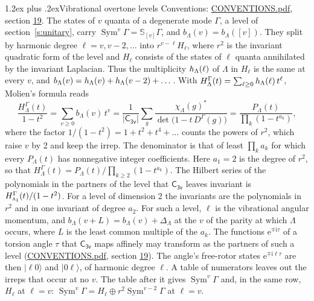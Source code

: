 \documentclass[10pt,a4paper]{article}
\makeatletter
\renewcommand\section{\@startsection{section}{1}{\z@}{-3ex plus -1ex minus -.2ex}%
  {1.2ex plus .2ex}{\normalfont\large\sffamily\bfseries\color{parttitle}}}
\numberwithin{equation}{section}
\newcommand{\grp}[1]{\mathsf{#1}}
\newcommand{\irr}[1]{\text{\normalfont\scshape #1}}
\newcommand{\iunit}{\mathrm{i}}
\newcommand{\expe}{\mathrm{e}}
\newcommand{\repD}[1]{D^{#1}}
\newcommand{\irchar}[1]{\chi_{#1}}
\newcommand{\conj}[1]{{#1}^{*}}
\newcommand{\schur}[1]{\mathbb{S}_{#1}}
\newcommand{\shape}[1]{[#1]}
\newcommand{\occ}[1]{\lvert #1\rangle}
\makeatother
\begin{document}
\section{Vibrational overtone levels}\label{s:overtones}
Conventions: \href{../../CONVENTIONS.pdf}{CONVENTIONS.pdf}, section \href{../../CONVENTIONS.pdf\#conv.19}{19}.
\leavevmode\label{n:index.quanta}\label{n:operator.symmetric.power}The states of $v$ quanta of a degenerate mode $\Gamma$, a level of section~\ref{s:unitary}, carry $\operatorname{Sym}^{v}\Gamma = \schur{\shape{v}}\Gamma$, and $b_\Lambda(v) = b_\Lambda(\shape{v})$. \label{n:local.quadratic.form}\label{n:set.harmonic}They split by harmonic degree $\ell = v, v - 2, \dots$ into $r^{v-\ell}H_\ell$, where $r^2$ is the invariant quadratic form of the level and $H_\ell$ consists of the states of $\ell$ quanta annihilated by the invariant Laplacian. \label{n:function.multiplicity.harmonic}Thus the multiplicity $\mathnormal{h}_\Lambda(\ell)$ of $\Lambda$ in $H_\ell$ is the same at every $v$, and $b_\Lambda(v) = \mathnormal{h}_\Lambda(v) + \mathnormal{h}_\Lambda(v - 2) + \dots$. \label{n:function.generating.level}With $H^{\Gamma}_\Lambda(t) = \sum_{\ell\ge0} \mathnormal{h}_\Lambda(\ell)\,t^{\ell}$, Molien's formula reads
\begin{equation}\label{e:molien}\frac{H^{\Gamma}_\Lambda(t)}{1 - t^2} = \sum_{v\ge0} b_\Lambda(v)\,t^v = \frac{1}{|\grp{C_{3v}}|}\sum_{g}\frac{\conj{\irchar{\Lambda}(g)}}{\det\bigl(1 - t\,\repD{\Gamma}(g)\bigr)} = \frac{P_\Lambda(t)}{\prod_k (1-t^{a_k})},\end{equation}
where the factor $1/(1 - t^2) = 1 + t^2 + t^4 + \dots$ counts the powers of $r^2$, which raise $v$ by 2 and keep the irrep. The denominator is that of least $\prod_k a_k$ for which every $P_\Lambda(t)$ has nonnegative integer coefficients. Here $a_1 = 2$ is the degree of $r^2$, so that $H^{\Gamma}_\Lambda(t) = P_\Lambda(t)/\prod_{k\ge2}(1 - t^{a_k})$. The Hilbert series of the polynomials in the partners of the level that $\grp{C_{3v}}$ leaves invariant is $H^{\Gamma}_{\irr{a}_{1}}(t)/(1 - t^2)$. For a level of dimension 2 the invariants are the polynomials in $r^2$ and in one invariant of degree $a_2$. \label{n:index.overtone.period}\label{n:index.increment.unitary}For such a level, $\ell$ is the vibrational angular momentum, and $b_\Lambda(v + L) = b_\Lambda(v) + \Delta_\Lambda$ at the $v$ of the parity at which $\Lambda$ occurs, where $L$ is the least common multiple of the $a_k$. \label{n:local.torsion.angle}The functions $\expe^{\mp\iunit\tau}$ of a torsion angle $\tau$ that $\grp{C_{3v}}$ maps affinely may transform as the partners of such a level (\href{../../CONVENTIONS.pdf}{CONVENTIONS.pdf}, section \href{../../CONVENTIONS.pdf\#conv.19}{19}). The angle's free-rotor states $\expe^{\mp\iunit\ell\tau}$ are then $\occ{\ell 0}$ and $\occ{0 \ell}$, of harmonic degree $\ell$. A table of numerators leaves out the irreps that occur at no $v$. The table after it gives $\operatorname{Sym}^{v}\Gamma$ and, in the same row, $H_\ell$ at $\ell = v$: $\operatorname{Sym}^{v}\Gamma = H_\ell \oplus r^2\operatorname{Sym}^{v-2}\Gamma$ at $\ell = v$.
\end{document}
